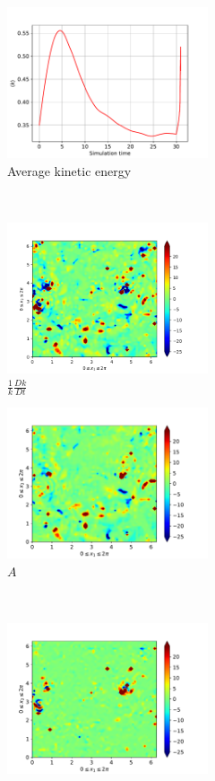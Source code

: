 \begin{figure}[H]
    \begin{subfigure}[H]{0.45\textwidth}
        \includegraphics[height=1.75in]{media/run-cds-65/ke-average1460}
        \caption{Average kinetic energy}
    \end{subfigure}
    ~
    \begin{subfigure}[H]{0.45\textwidth}
        \includegraphics[height=1.75in]{media/run-cds-65/ke-1460}
        \caption{$\frac{1}{k} \frac{D k}{Dt}$}
    \end{subfigure}
    \newline
    \begin{subfigure}{0.45\textwidth}
        \includegraphics[height=1.75in]{media/run-cds-65/A-ke-1460}
        \caption{$A$}
    \end{subfigure}
    ~
    \begin{subfigure}{0.45\textwidth}
        \includegraphics[height=1.75in]{media/run-cds-65/C-ke-1460}

\end{subfigure}
\end{figure}
